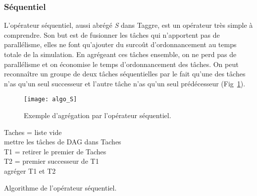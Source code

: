 \subsubsection{Séquentiel}
L'opérateur séquentiel, aussi abrégé {\em S} dans Taggre, est un opérateur très simple à comprendre.
%
Son but est de fusionner les tâches qui n'apportent pas de parallélisme, elles ne font qu'ajouter du surcoût d'ordonnancement au temps totale de la simulation.
%
En agrégeant ces tâches ensemble, on ne perd pas de parallélisme et on économise le temps d'ordonnancement des tâches.
%
On peut reconnaître un groupe de deux tâches séquentielles par le fait qu'une des tâches n'as qu'un seul successeur et l'autre tâche n'as qu'un seul prédécesseur (Fig~\ref{fig:algo_S}).


\begin{figure}[t!]
  \centering
  \texttt{[image: algo\_S]}
  \caption{Exemple d'agrégation par l'opérateur séquentiel.}
  \label{fig:algo_S}
\end{figure}

\begin{algorithm}
  {\sc Taches} = liste vide \\
  mettre les tâches de DAG dans {\sc Taches} \\
   {
    {\sc T1} = retirer le premier de {\sc Taches} \\
     {
      {\sc T2} = premier successeur de {\sc T1} \\
       {
        agréger {\sc T1} et {\sc T2}\\
      }
    }
  }
  \caption{Algorithme de l'opérateur séquentiel.}
  \label{algo:algo_S}
\end{algorithm}
